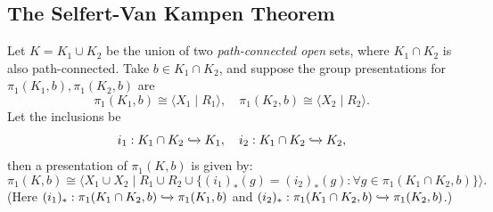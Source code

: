 \subsection{The Selfert-Van Kampen Theorem}
\begin{theorem}
Let $K=K_1\cup K_2$ be the union of two \emph{path-connected open} sets, where $K_1\cap K_2$ is also path-connected.
Take $b\in K_1\cap K_2$, and suppose the group presentations for $\pi_1(K_1,b),\pi_1(K_2,b)$ are 
\[
\pi_1(K_1,b)\cong\langle X_1\mid R_1\rangle,\quad
\pi_1(K_2,b)\cong\langle X_2\mid R_2\rangle.
\]
Let the inclusions be
\[
i_1:K_1\cap K_2\xhookrightarrow{}K_1,\quad
i_2:K_1\cap K_2\xhookrightarrow{}K_2,
\]
then a presentation of $\pi_1(K,b)$ is given by:
\[
\pi_1(K,b) \cong\langle
X_1\cup X_2\mid 
R_1\cup R_2\cup 
\{(i_1)_*(g)=(i_2)_*(g): \forall g\in\pi_1(K_1\cap K_2,b)\}
\rangle.
\]
(Here $(i_1)_*:\pi_1(K_1\cap K_2,b)\xhookrightarrow{}\pi_1(K_1,b)$ and $(i_2)_*:\pi_1(K_1\cap K_2,b)\xhookrightarrow{}\pi_1(K_2,b)$.)
\end{theorem}


